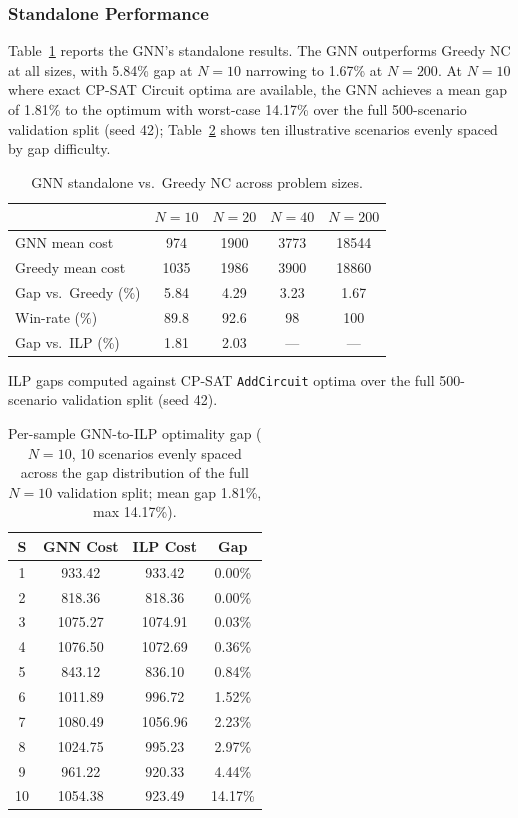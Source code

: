 \documentclass[review,times]{elsarticle}
\begin{document}
\subsubsection{Standalone Performance}

Table~\ref{tab:cross_size} reports the GNN's standalone results. The GNN outperforms Greedy NC at all sizes, with 5.84\% gap at $N{=}10$ narrowing to 1.67\% at $N{=}200$. At $N{=}10$ where exact CP-SAT Circuit optima are available, the GNN achieves a mean gap of 1.81\% to the optimum with worst-case 14.17\% over the full 500-scenario validation split (seed 42); Table~\ref{tab:ilp_gap} shows ten illustrative scenarios evenly spaced by gap difficulty.

\begin{table}[htbp]
\caption{GNN standalone vs.\ Greedy NC across problem sizes.}
\label{tab:cross_size}
\centering
\begin{tabular}{@{}lcccc@{}}
\toprule
& $N{=}10$ & $N{=}20$ & $N{=}40$ & $N{=}200$ \\
\midrule
GNN mean cost        & 974   & 1900  & 3773  & 18544 \\
Greedy mean cost     & 1035  & 1986  & 3900  & 18860 \\
Gap vs.\ Greedy (\%)     & 5.84  & 4.29  & 3.23  & 1.67 \\
Win-rate (\%)        & 89.8  & 92.6  & 98    & 100 \\
Gap vs.\ ILP (\%)   & 1.81  & 2.03  & ---   & --- \\
\bottomrule
\end{tabular}
\vspace{1mm}

\footnotesize ILP gaps computed against CP-SAT \texttt{AddCircuit} optima over the full 500-scenario validation split (seed 42).
\end{table}

\begin{table}[htbp]
\caption{Per-sample GNN-to-ILP optimality gap ($N{=}10$, 10 scenarios evenly spaced across the gap distribution of the full $N{=}10$ validation split; mean gap 1.81\%, max 14.17\%).}
\label{tab:ilp_gap}
\centering
\begin{tabular}{@{}cccc@{}}
\toprule
\textbf{S} & \textbf{GNN Cost} & \textbf{ILP Cost} & \textbf{Gap} \\
\midrule
1  & 933.42  & 933.42  & 0.00\% \\
2  & 818.36  & 818.36  & 0.00\% \\
3  & 1075.27 & 1074.91 & 0.03\% \\
4  & 1076.50 & 1072.69 & 0.36\% \\
5  & 843.12  & 836.10  & 0.84\% \\
6  & 1011.89 & 996.72  & 1.52\% \\
7  & 1080.49 & 1056.96 & 2.23\% \\
8  & 1024.75 & 995.23  & 2.97\% \\
9  & 961.22  & 920.33  & 4.44\% \\
10 & 1054.38 & 923.49  & 14.17\% \\
\bottomrule
\end{tabular}
\end{table}
\end{document}
